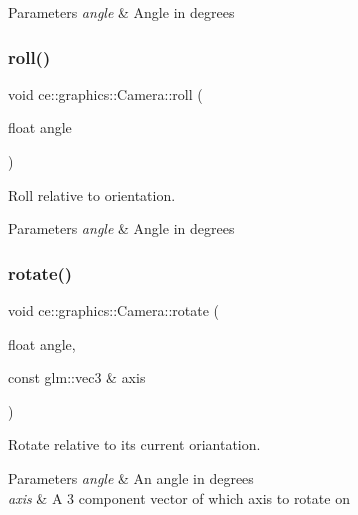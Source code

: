 \begin{DoxyParams}{Parameters}
{\em angle} & Angle in degrees \\
\hline
\end{DoxyParams}
\mbox{\label{classce_1_1graphics_1_1_camera_a3e037adde223d673eb581fdbc536e29c}} 
\subsubsection{\texorpdfstring{roll()}{roll()}}
{\footnotesize\ttfamily void ce\+::graphics\+::\+Camera\+::roll (\begin{DoxyParamCaption}\item[{float}]{angle }\end{DoxyParamCaption})}



Roll relative to orientation. 


\begin{DoxyParams}{Parameters}
{\em angle} & Angle in degrees \\
\hline
\end{DoxyParams}
\mbox{\label{classce_1_1graphics_1_1_camera_a72ea4add5776476ebdf572d770d7ce7f}} 
\subsubsection{\texorpdfstring{rotate()}{rotate()}\hspace{0.1cm}{\footnotesize\ttfamily [1/2]}}
{\footnotesize\ttfamily void ce\+::graphics\+::\+Camera\+::rotate (\begin{DoxyParamCaption}\item[{float}]{angle,  }\item[{const glm\+::vec3 \&}]{axis }\end{DoxyParamCaption})}



Rotate relative to its current oriantation. 


\begin{DoxyParams}{Parameters}
{\em angle} & An angle in degrees \\
\hline
{\em axis} & A 3 component vector of which axis to rotate on \\
\hline
\end{DoxyParams}
\mbox{\label{classce_1_1graphics_1_1_camera_afa185e4bfffac08c2df33eed249098e1}} 
